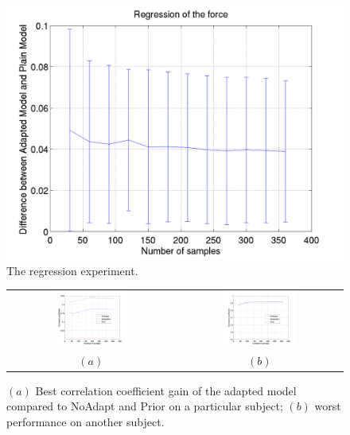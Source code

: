 \begin{figure}[ht]
  \centering
  \includegraphics[width=0.95\linewidth]{figs/exp2}
  \caption{The regression experiment.}
  \label{fig:diff_reg}
\end{figure}

\begin{figure}[ht] \centering
  \begin{tabular}{cc}
    \includegraphics[width=0.45\textwidth]{figs/exp2_abs_best} &
    \includegraphics[width=0.45\textwidth]{figs/exp2_abs_worst} \\
    $(a)$ & $(b)$ \\
  \end{tabular}
  \caption{$(a)$ Best correlation coefficient gain of the adapted model compared to NoAdapt
 and Prior on a particular subject; $(b)$ worst performance on another subject.}
  \label{fig:reg_abs}
\end{figure}
